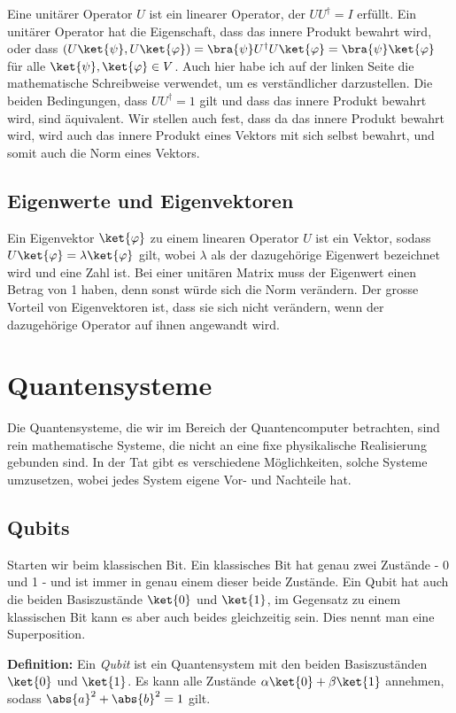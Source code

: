Eine unitärer Operator $U$ ist ein linearer Operator, der $UU^{\dagger} = I$ erfüllt. Ein unitärer Operator hat die Eigenschaft, dass das innere Produkt bewahrt wird, oder dass $(U\ket{\psi}, U\ket{\varphi}) = \bra{\psi}U^{\dagger}U\ket{\varphi} = \bra{\psi}\ket{\varphi}$ für alle $\ket{\psi}, \ket{\varphi} \in V$. Auch hier habe ich auf der linken Seite die mathematische Schreibweise verwendet, um es verständlicher darzustellen. Die beiden Bedingungen, dass $UU^{\dagger} = 1$ gilt und dass das innere Produkt bewahrt wird, sind äquivalent. Wir stellen auch fest, dass da das innere Produkt bewahrt wird, wird auch das innere Produkt eines Vektors mit sich selbst bewahrt, und somit auch die Norm eines Vektors.

\subsection{Eigenwerte und Eigenvektoren}
Ein Eigenvektor $\ket{\varphi}$ zu einem linearen Operator $U$ ist ein Vektor, sodass $U\ket{\varphi} = \lambda\ket{\varphi}$ gilt, wobei $\lambda$ als der dazugehörige Eigenwert bezeichnet wird und eine Zahl ist. Bei einer unitären Matrix muss der Eigenwert einen Betrag von 1 haben, denn sonst würde sich die Norm verändern. Der grosse Vorteil von Eigenvektoren ist, dass sie sich nicht verändern, wenn der dazugehörige Operator auf ihnen angewandt wird.

\section{Quantensysteme}
Die Quantensysteme, die wir im Bereich der Quantencomputer betrachten, sind rein mathematische Systeme, die nicht an eine fixe physikalische Realisierung gebunden sind. In der Tat gibt es verschiedene Möglichkeiten, solche Systeme umzusetzen, wobei jedes System eigene Vor- und Nachteile hat.

\subsection{Qubits}
Starten wir beim klassischen Bit. Ein klassisches Bit hat genau zwei Zustände - 0 und 1 - und ist immer in genau einem dieser beide Zustände. Ein Qubit hat auch die beiden Basiszustände $\ket{0}$ und $\ket{1}$, im Gegensatz zu einem klassischen Bit kann es aber auch beides gleichzeitig sein. Dies nennt man eine Superposition. 

\textbf{Definition:} Ein \textit{Qubit} ist ein Quantensystem mit den beiden Basiszuständen $\ket{0}$ und $\ket{1}$. Es kann alle Zustände $\alpha\ket{0} + \beta\ket{1}$ annehmen, sodass $\abs{a}^2 + \abs{b}^2 = 1$ gilt.


